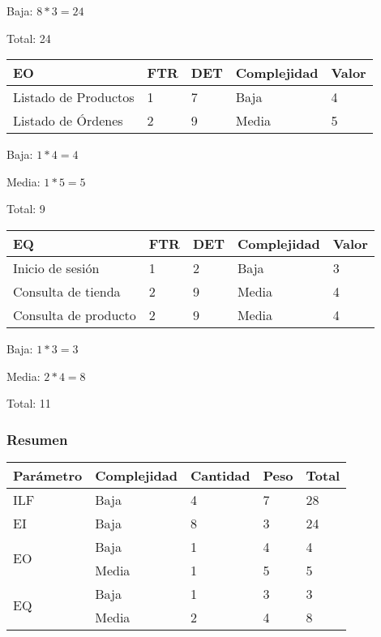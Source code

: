Baja: $8 * 3 = 24$

Total: 24

\begin{table}[H]
    \centering
    \begin{tabular}{|l|l|l|l|l|}
        \hline
        EO                   & FTR & DET & Complejidad & Valor \\ \hline
        Listado de Productos & 1   & 7   & Baja        & 4     \\ \hline
        Listado de Órdenes   & 2   & 9   & Media       & 5     \\
        \hline
    \end{tabular}
\end{table}

Baja: $1 * 4 = 4$

Media: $1 * 5 = 5$

Total: 9

\begin{table}[H]
\centering
    \begin{tabular}{|l|l|l|l|l|}
        \hline
        EQ                   & FTR & DET & Complejidad & Valor \\ \hline
        Inicio de sesión     & 1   & 2   & Baja        & 3     \\ \hline
        Consulta de tienda   & 2   & 9   & Media       & 4     \\ \hline
        Consulta de producto & 2   & 9   & Media       & 4     \\
        \hline
    \end{tabular}
\end{table}

Baja: $1 * 3 = 3$

Media: $2 * 4 = 8$

Total: 11

    \subsubsection{Resumen}
    
    \begin{table}[H]
    \centering
    \begin{tabular}{|l|l|l|l|l|}
        \hline
        Parámetro & Complejidad & Cantidad & Peso & Total \\ \hline
        ILF       & Baja        & 4        & 7    & 28    \\ \hline
        EI        & Baja        & 8        & 3    & 24    \\ \hline
        \multirow{2}{*}{EO}        & Baja        & 1        & 4    & 4     \\ \cline{2-5}
                & Media       & 1        & 5    & 5     \\ \hline
        \multirow{2}{*}{EQ}        & Baja        & 1        & 3    & 3     \\ \cline{2-5}
                 & Media       & 2        & 4    & 8     \\ \hline
    \end{tabular}
\end{table}
    
